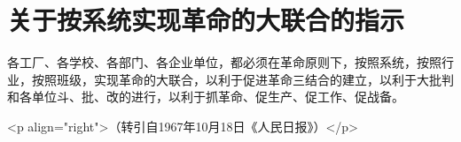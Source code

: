 \section[关于按系统实现革命的大联合的指示（一九六七年十月十七日）]{关于按系统实现革命的大联合的指示}


各工厂、各学校、各部门、各企业单位，都必须在革命原则下，按照系统，按照行业，按照班级，实现革命的大联合，以利于促进革命三结合的建立，以利于大批判和各单位斗、批、改的进行，以利于抓革命、促生产、促工作、促战备。

<p align="right">（转引自1967年10月18日《人民日报》）</p>



